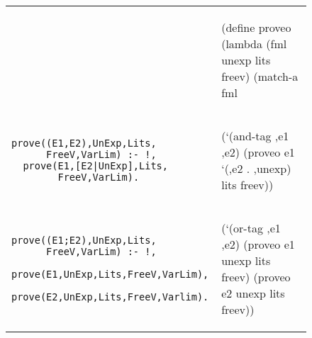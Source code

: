 \begin{figure}[H]

\begin{tabular}{l l}

 &

\begin{minipage}{2.3in}
\begin{schemedisplay}
 (define proveo
   (lambda (fml unexp lits freev)
     (match-a fml
\end{schemedisplay}
\end{minipage} \\


\begin{minipage}{2.3in}
\begin{verbatim}
prove((E1,E2),UnExp,Lits,
      FreeV,VarLim) :- !,
  prove(E1,[E2|UnExp],Lits,
        FreeV,VarLim).
\end{verbatim}
\end{minipage}
 &
\begin{minipage}{2in}
\begin{schemedisplay}
      (`(and-tag ,e1 ,e2)
        (proveo e1 `(,e2 . ,unexp) lits freev))
\end{schemedisplay}
\end{minipage}
\\

\begin{minipage}{2in}
\begin{verbatim}
prove((E1;E2),UnExp,Lits,
      FreeV,VarLim) :- !,
  prove(E1,UnExp,Lits,FreeV,VarLim),
  prove(E2,UnExp,Lits,FreeV,Varlim).
\end{verbatim}
\end{minipage}
 &
\begin{minipage}{2in}
\vspace{1mm}
\begin{schemedisplay}
      (`(or-tag ,e1 ,e2)
        (proveo e1 unexp lits freev)
        (proveo e2 unexp lits freev))
\end{schemedisplay}
\vspace{1mm}
\end{minipage}
\\


\end{tabular}
\end{figure}
